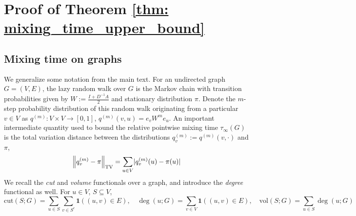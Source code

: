 \documentclass[11pt,twoside]{article}
\DeclarePairedDelimiter\abs{\lvert}{\rvert}
\newcommand{\vol}{\mathrm{vol}}
\newcommand{\cut}{\mathrm{cut}}
\newcommand{\norm}[1]{\left\lVert#1\right\rVert}
\newcommand{\1}{\mathbf{1}}
\newcommand{\Err}{\mathrm{Err}}
\newcommand{\Abf}{A}
\newcommand{\Wbf}{W}
\newcommand{\Dbf}{D}
\newcommand{\Ibf}[1]{I_{#1}}
\begin{document}

\section{Proof of Theorem \ref{thm: mixing_time_upper_bound}}

\subsection{Mixing time on graphs}
\label{sec: mixing_time_on_graphs}

We generalize some notation from the main text. For an undirected graph $G = (V,E)$, the lazy random walk over $G$ is the Markov chain with transition probabilities given by $\Wbf := \frac{\Ibf{} + \Dbf^{-1} \Abf}{2}$ and stationary distribution $\pi$.  Denote the $m$-step probability distribution of this random walk originating from a particular $v \in V$ as $q^{(m)}: V \times V \to [0,1]$, $q^{(m)}(v,u) = e_v \Wbf^m e_u$. An important intermediate quantity used to bound the relative pointwise mixing time $\tau_{\infty}(G)$ is the total variation distance between the distributions $q_v^{(m)} := q^{(m)}(v,\cdot)$ and $\pi$,
\begin{equation*}
\norm{q_v^{(m)} - \pi}_{\mathrm{TV}} = \sum_{u \in V} \abs{q_v^{(m)}(u) - \pi(u)}
\end{equation*}
We recall the \emph{cut} and \emph{volume} functionals over a graph, and introduce the \emph{degree} functional as well. For $u \in V$, $S \subseteq V$, 
\begin{equation*}
\cut(S;G) = \sum_{u \in S} \sum_{v \in S^c} \1((u,v) \in E), \quad \deg(u;G) = \sum_{v \in V} \1((u,v) \in E), \quad \vol(S;G) = \sum_{u \in S} \deg(u;G)
\end{equation*}
\end{document}
